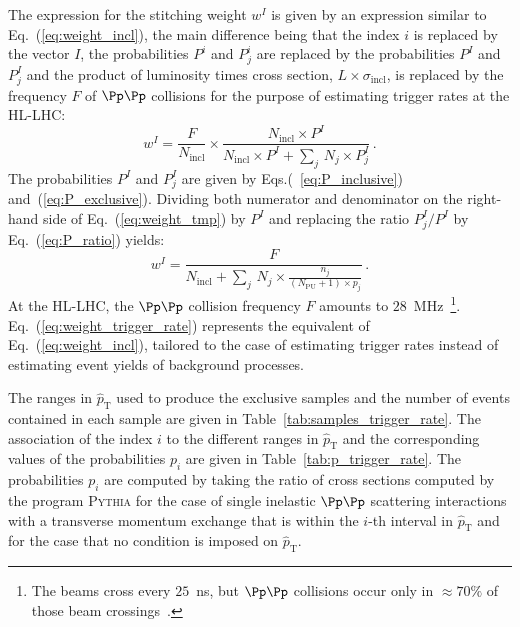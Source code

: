 \documentclass[twocolumn,epjc3]{svjour3}
\newcommand{\pThat}{\ensuremath{\hat{p}_{\textrm{T}}}\xspace}
\newcommand{\incl}{\ensuremath{\textrm{incl}}\xspace}
\newcommand{\pileup}{\ensuremath{\textrm{PU}}\xspace}
\newcommand{\PYTHIA}{\textsc{Pythia}\xspace}
\begin{document}
The expression for the stitching weight $w^{I}$ is given by an expression similar to Eq.~(\ref{eq:weight_incl}),
the main difference being that the index $i$ is replaced by the vector $I$,
the probabilities $P^{i}$ and $P_{j}^{i}$ are replaced by the probabilities $P^{I}$ and $P_{j}^{I}$
and the product of luminosity times cross section, $L \times \sigma_{\incl}$, is replaced by the frequency $F$ of $\Pp\Pp$ collisions 
for the purpose of estimating trigger rates at the HL-LHC:
\begin{equation}
w^{I} = \frac{F}{N_{\incl}} \times \frac{N_{\incl} \times P^{I}}{N_{\incl} \times P^{I} + \sum_{j} \, N_{j} \times P_{j}^{I}} \, .
\label{eq:weight_tmp}
\end{equation}
The probabilities $P^{I}$ and $P_{j}^{I}$ are given by Eqs.(~\ref{eq:P_inclusive}) and~(\ref{eq:P_exclusive}).
Dividing both numerator and denominator on the right-hand side of Eq.~(\ref{eq:weight_tmp}) by $P^{I}$ and replacing the ratio $P_{j}^{I}/P^{I}$ by Eq.~(\ref{eq:P_ratio}) yields:
\begin{equation}
w^{I} = \frac{F}{N_{\incl} + \sum_{j} \, N_{j} \times \frac{n_{j}}{(N_{\pileup} + 1) \times p_{j}}} \, .
\label{eq:weight_trigger_rate}
\end{equation}
At the HL-LHC, the $\Pp\Pp$ collision frequency $F$ amounts to $28$~MHz~\footnote{
  The beams cross every $25$~ns, but $\Pp\Pp$ collisions occur only in $\approx 70\%$ of those beam crossings~\cite{TDR_Phase2_LHC}.}.
Eq.~(\ref{eq:weight_trigger_rate}) represents the equivalent of Eq.~(\ref{eq:weight_incl}),
tailored to the case of estimating trigger rates instead of estimating event yields of background processes.

The ranges in $\pThat$ used to produce the exclusive samples and the number of events contained in each sample
are given in Table~\ref{tab:samples_trigger_rate}.
The association of the index $i$ to the different ranges in $\pThat$ and the 
corresponding values of the probabilities $p_{i}$ are given in Table~\ref{tab:p_trigger_rate}.
The probabilities $p_{i}$ are computed by taking the ratio of cross sections computed by the program \PYTHIA
for the case of single inelastic $\Pp\Pp$ scattering interactions with a transverse momentum exchange that is within the $i$-th interval in $\pThat$
and for the case that no condition is imposed on $\pThat$.
\end{document}
